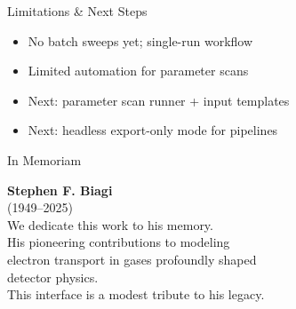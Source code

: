 \documentclass[aspectratio=169]{beamer}
\begin{document}
\begin{frame}{Limitations \& Next Steps}
\begin{itemize}
  \item No batch sweeps yet; single-run workflow
  \item Limited automation for parameter scans
  \item Next: parameter scan runner + input templates
  \item Next: headless export-only mode for pipelines
\end{itemize}
\end{frame}

\begin{frame}{In Memoriam}
\vspace{0.3cm}
\begin{center}
\large
\textbf{Stephen F. Biagi}\\
{\footnotesize (1949--2025)}\\
\vspace{0.25cm}
We dedicate this work to his memory.\\
\vspace{0.25cm}
His pioneering contributions to modeling\\
electron transport in gases profoundly shaped\\
detector physics.\\
\vspace{0.35cm}
\normalsize
This interface is a modest tribute to his legacy.
\end{center}
\end{frame}
\end{document}
